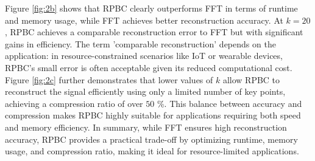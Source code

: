 \documentclass[onecolumn,conference]{IEEEtran}
\begin{document}
Figure \ref{fig:2b} shows that RPBC clearly outperforms FFT in terms of runtime and memory usage, while FFT achieves better reconstruction accuracy. At $k=20$, RPBC achieves a comparable reconstruction error to FFT but with significant gains in efficiency. The term 'comparable reconstruction' depends on the application: in resource-constrained scenarios like IoT or wearable devices, RPBC’s small error is often acceptable given its reduced computational cost. Figure \ref{fig:2c} further demonstrates that lower values of $k$ allow RPBC to reconstruct the signal efficiently using only a limited number of key points, achieving a compression ratio of over $50$ \%. This balance between accuracy and compression makes RPBC highly suitable for applications requiring both speed and memory efficiency. In summary, while FFT ensures high reconstruction accuracy, RPBC provides a practical trade-off by optimizing runtime, memory usage, and compression ratio, making it ideal for resource-limited applications.
\end{document}
